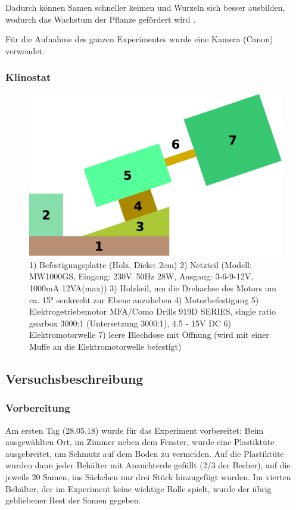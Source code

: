 \documentclass[
a4paper, 
11pt, 
ngerman,
listof=totoc,
bibliography=totocnumbered,
abstracton
]{scrreprt}
\begin{document}
Dadurch können Samen schneller keimen und Wurzeln sich besser ausbilden, wodurch das Wachstum der Pflanze gefördert wird \parencite{Windhager}. 

Für die Aufnahme des ganzen Experimentes wurde eine Kamera (Canon) verwendet.


\subsubsection{Klinostat}

 \begin{figure}[H]
 	\centering 
 	\includegraphics[width = 0.5\linewidth]{images/drawing-1.pdf}
 	\caption{1) Befestigungsplatte (Holz, Dicke: 2cm) 2) Netzteil (Modell: MW1000GS, Eingang: 230V~50Hz 28W, Ausgang: 3-6-9-12V, 1000mA 12VA(max)) 3) Holzkeil, um die Drehachse des Motors um ca. \ang{15} senkrecht zur Ebene anzuheben 4) Motorbefestigung 5) Elektrogetriebemotor MFA/Como Drills 919D SERIES, single ratio gearbox 3000:1 (Untersetzung 3000:1), 4.5 - 15V DC	6) Elektromotorwelle 7) leere Blechdose mit Öffnung (wird mit einer Muffe an die Elektromotorwelle befestigt)}
 \end{figure} 

\subsection{Versuchsbeschreibung}

\subsubsection{Vorbereitung}

Am ersten Tag (28.05.18) wurde für das Experiment vorbereitet: Beim ausgewählten Ort, im Zimmer neben dem Fenster, wurde eine Plastiktüte ausgebreitet, um Schmutz auf dem Boden zu vermeiden. Auf die Plastiktüte wurden dann jeder Behälter mit Anzuchterde gefüllt (2/3 der Becher), auf die jeweils 20 Samen, ins Säckchen nur drei Stück hinzugefügt wurden. Im vierten Behälter, der im Experiment keine wichtige Rolle spielt, wurde der übrig gebliebener Rest der Samen gegeben.
\end{document}
